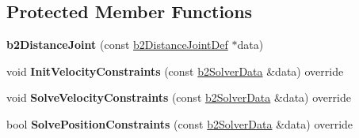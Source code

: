 \subsection*{Protected Member Functions}
\begin{DoxyCompactItemize}
\item 
\mbox{\label{classb2_distance_joint_ad2bb6de92a47868629a7397e23256454}} 
{\bfseries b2\+Distance\+Joint} (const \hyperlink{structb2_distance_joint_def}{b2\+Distance\+Joint\+Def} $\ast$data)
\item 
\mbox{\label{classb2_distance_joint_abe956dd5951651b36321098416ad99fd}} 
void {\bfseries Init\+Velocity\+Constraints} (const \hyperlink{structb2_solver_data}{b2\+Solver\+Data} \&data) override
\item 
\mbox{\label{classb2_distance_joint_ad42429151fb979a230f103d684d2a42c}} 
void {\bfseries Solve\+Velocity\+Constraints} (const \hyperlink{structb2_solver_data}{b2\+Solver\+Data} \&data) override
\item 
\mbox{\label{classb2_distance_joint_a431d12fac5ee9f6a5637321ee28119bc}} 
bool {\bfseries Solve\+Position\+Constraints} (const \hyperlink{structb2_solver_data}{b2\+Solver\+Data} \&data) override
\end{DoxyCompactItemize}
